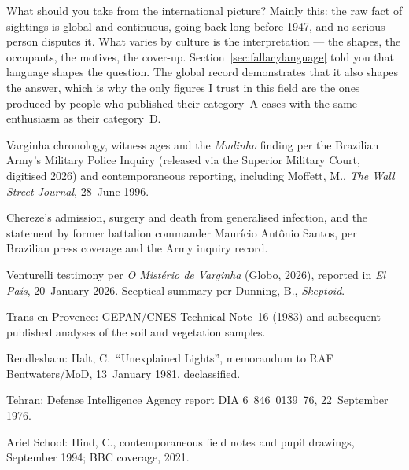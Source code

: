 What should you take from the international picture? Mainly this: the raw fact of
sightings is global and continuous, going back long before 1947, and no serious person
disputes it. What varies by culture is the interpretation --- the shapes, the occupants,
the motives, the cover-up. Section~\ref{sec:fallacylanguage} told you that language shapes the question. The
global record demonstrates that it also shapes the answer, which is why the only figures
I trust in this field are the ones produced by people who published their category~A
cases with the same enthusiasm as their category~D.

\begin{srcnotes}
\item Varginha chronology, witness ages and the \emph{Mudinho} finding per the Brazilian
Army's Military Police Inquiry (released via the Superior Military Court, digitised 2026)
and contemporaneous reporting, including Moffett, M., \emph{The Wall Street Journal},
28~June 1996.
\item Chereze's admission, surgery and death from generalised infection, and the statement
by former battalion commander Maur\'icio Ant\^onio Santos, per Brazilian press coverage and
the Army inquiry record.
\item Venturelli testimony per \emph{O Mist\'erio de Varginha} (Globo, 2026), reported in
\emph{El Pa\'is}, 20~January 2026. Sceptical summary per Dunning, B., \emph{Skeptoid}.
\item Trans-en-Provence: GEPAN/CNES Technical Note~16 (1983) and subsequent published
analyses of the soil and vegetation samples.
\item Rendlesham: Halt, C.\ ``Unexplained Lights'', memorandum to RAF Bentwaters/MoD,
13~January 1981, declassified.
\item Tehran: Defense Intelligence Agency report DIA 6~846~0139~76, 22~September 1976.
\item Ariel School: Hind, C., contemporaneous field notes and pupil drawings, September
1994; BBC coverage, 2021.
\end{srcnotes}
